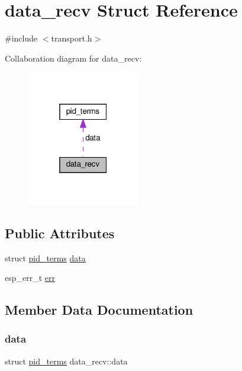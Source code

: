 \hypertarget{structdata__recv}{}\section{data\+\_\+recv Struct Reference}
\label{structdata__recv}


{\ttfamily \#include $<$transport.\+h$>$}



Collaboration diagram for data\+\_\+recv\+:
\nopagebreak
\begin{figure}[H]
\begin{center}
\leavevmode
\includegraphics[width=139pt]{structdata__recv__coll__graph}
\end{center}
\end{figure}
\subsection*{Public Attributes}
\begin{DoxyCompactItemize}
\item 
struct \hyperlink{structpid__terms}{pid\+\_\+terms} \hyperlink{structdata__recv_af60b2e3d44df4ef57e1998ff55783920}{data}
\item 
esp\+\_\+err\+\_\+t \hyperlink{structdata__recv_a96d1938d8172e27035f655727f675273}{err}
\end{DoxyCompactItemize}


\subsection{Member Data Documentation}
\mbox{\label{structdata__recv_af60b2e3d44df4ef57e1998ff55783920}} 
\subsubsection{\texorpdfstring{data}{data}}
{\footnotesize\ttfamily struct \hyperlink{structpid__terms}{pid\+\_\+terms} data\+\_\+recv\+::data}

